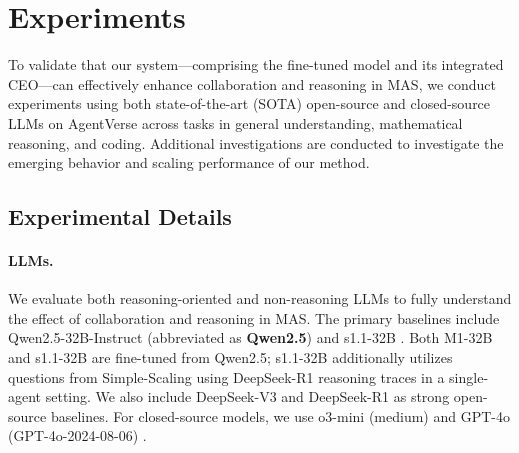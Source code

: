 
\section{Experiments}
To validate that our system—comprising the fine-tuned model and its integrated CEO—can effectively enhance collaboration and reasoning in MAS, we conduct experiments using both state-of-the-art (SOTA) open-source and closed-source LLMs on AgentVerse across tasks in general understanding, mathematical reasoning, and coding. Additional investigations are conducted to investigate the emerging behavior and scaling performance of our method.

\subsection{Experimental Details}\label{sec:experimental_details}
\paragraph{LLMs.} We evaluate both reasoning-oriented and non-reasoning LLMs to fully understand the effect of collaboration and reasoning in MAS. The primary baselines include Qwen2.5-32B-Instruct (abbreviated as \textbf{Qwen2.5}) \citep{qwen25} and s1.1-32B \citep{s1}. Both M1-32B and s1.1-32B are fine-tuned from Qwen2.5; s1.1-32B additionally utilizes questions from Simple-Scaling \citep{s1} using DeepSeek-R1 reasoning traces in a single-agent setting. We also include DeepSeek-V3 \citep{deepseek_v3} and DeepSeek-R1 \citep{r1} as strong open-source baselines. For closed-source models, we use o3-mini (medium) \citep{o3-mini} and GPT-4o (GPT-4o-2024-08-06) \citep{gpt4o}.

